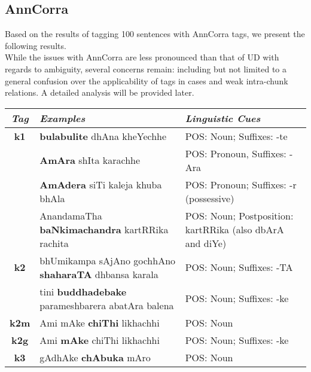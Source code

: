 \documentclass[a4 paper]{article}
\begin{document}
\subsection{AnnCorra}
Based on the results of tagging 100 sentences with AnnCorra tags, we present the
following results.\\
While the issues with AnnCorra are less pronounced than that of UD with regards
to ambiguity, several concerns remain: including but not limited to a general
confusion over the applicability of tags in cases and weak intra-chunk
relations. A detailed analysis will be provided later.

\begin{longtable}{cp{}p{}}
    \toprule
    \textit{Tag} & \textit{Examples} & \textit{Linguistic Cues} \\ 
    \toprule
    \addlinespace[0.5em]
    \textbf{k1}
                 & \textbf{bulabulite} dhAna kheYechhe
                 & POS: Noun; Suffixes: -te\\
    \addlinespace[0.5em]
                 & \textbf{AmAra} shIta karachhe
                 & POS: Pronoun, Suffixes: -Ara\\
    \addlinespace[0.5em]
                 & \textbf{AmAdera} siTi kaleja khuba bhAla
                 & POS: Pronoun; Suffixes: -r (possessive)\\
    \addlinespace[0.5em]
                 & AnandamaTha \textbf{baNkimachandra} kartRRika rachita
                 & POS: Noun; Postposition: kartRRika (also dbArA and diYe)\\
    \midrule
    \addlinespace[0.5em]
    \textbf{k2}
                 & bhUmikampa sAjAno gochhAno \textbf{shaharaTA} dhbansa karala
                 & POS: Noun; Suffixes: -TA\\
    \addlinespace[0.5em]
                 & tini \textbf{buddhadebake} parameshbarera abatAra balena
                 & POS: Noun; Suffixes: -ke\\
    \midrule
    \addlinespace[0.5em]
    \textbf{k2m}
                 & Ami mAke \textbf{chiThi} likhachhi
                 & POS: Noun\\
    \midrule
    \addlinespace[0.5em]
    \textbf{k2g}
                 & Ami \textbf{mAke} chiThi likhachhi
                 & POS: Noun; Suffixes: -ke\\
    \midrule
    \addlinespace[0.5em]
    \textbf{k3}
                 & gAdhAke \textbf{chAbuka} mAro
                 & POS: Noun\\

\end{longtable}
\end{document}
